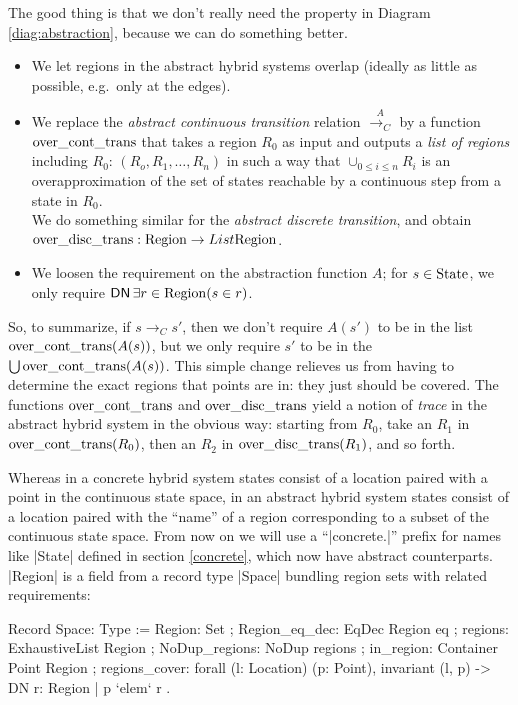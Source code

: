 \documentclass[runningheads]{llncs}
\newcommand{\DN}{{\sf DN}\,}
\newcommand{\State}{{\rm State}}
\newcommand{\Region}{{\rm Region}}
\newcommand{\contrans}{\rightarrow_C}
\newcommand{\acontrans}{\stackrel{A}{\rightarrow_C}}
\newcommand{\overcontrans}{{\rm over\_cont\_trans}}
\newcommand{\overdistrans}{{\rm over\_disc\_trans}}
\begin{document}
The good thing is that we don't really need the property in Diagram
\ref{diag:abstraction}, because we can do something better. 
\begin{itemize}
\item
We let regions in the abstract hybrid systems overlap (ideally as
little as possible, e.g.\ only at the edges).

\item
We replace the {\em abstract continuous transition\/} relation
$\acontrans$ by a function $\overcontrans$ that takes a region $R_0$
as input and outputs a {\em list of regions\/} including $R_0$: $(R_o,
R_1, \ldots, R_n)$ in such a way that $\cup_{0\leq i\leq n}R_i$ is an
overapproximation of the set of states reachable by a continuous step
from a state in $R_0$.\\
We do something similar for the {\em abstract discrete transition}, and obtain $\overdistrans :\Region \rightarrow List \Region$.
\item
We loosen the requirement on the abstraction function $A$; for $s \in \State$, we only require $\DN {\exists r\in \Region}{(s\in r)}$.
\end{itemize}

So, to summarize, if $s\contrans s'$, then we don't require
$A(s')$ to be in the list $\overcontrans(A(s))$, but we only require
$s'$ to be in the $\bigcup \overcontrans(A(s))$. 
This simple change relieves us from having to determine the exact
regions that points are in: they just should be covered. The functions
$\overcontrans$ and $\overdistrans$ yield a notion of {\em trace\/} in
the abstract hybrid system in the obvious way: starting from $R_0$,
take an $R_1$ in $\overcontrans( R_0)$, then an $R_2$ in
$\overdistrans(R_1)$, and so forth.

Whereas in a concrete hybrid system states consist of a location
paired with a point in the continuous state space, in an abstract
hybrid system states consist of a location paired with the ``name'' of
a region corresponding to a subset of the continuous state space.
From now on we will use a ``|concrete.|'' prefix for names like
|State| defined in section \ref{concrete}, which now have abstract
counterparts. |Region| is a field from a record type |Space| bundling
region sets with related requirements:

\begin{code}
  Record Space: Type :=
    { Region: Set
    ; Region_eq_dec: EqDec Region eq
    ; regions: ExhaustiveList Region
    ; NoDup_regions: NoDup regions
    ; in_region: Container Point Region
    ; regions_cover: forall (l: Location) (p: Point),
        invariant (l, p) -> DN { r: Region | p `elem` r }  }.
\end{code}
\end{document}
